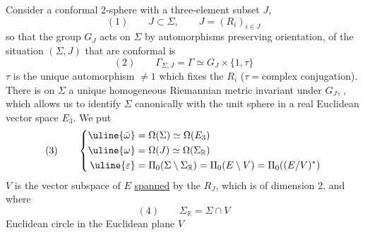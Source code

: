 Consider a conformal 2-sphere \inserted{$\Sigma$} with a three-element subset $J$,
\[
(1)\qquad J\subset\Sigma,\qquad J=(R_i)_{i\in J}
\]
so that the group $G_J$ acts on $\Sigma$ by automorphisms  preserving orientation,    of the situation $(\Sigma,J)$ that are conformal is
\[
(2)\qquad\Gamma_{\Sigma,J}=\Gamma\simeq G_J\times\{1,\tau\}
\]
$\tau$ is the unique  automorphism $\ne1$  which fixes the $R_i$  ($\tau={}$complex conjugation).
There is on $\Sigma$ a unique homogeneous Riemannian metric invariant under $G_J$,  , which allows us to identify $\Sigma$ canonically with the unit sphere in a real Euclidean vector space $E_3$. We put
\[
(3)\qquad\left\{\begin{aligned}
\uline{\bar\omega}&=\Omega(\Sigma)\simeq\Omega(E_3)\\
\uline{\omega}&=\Omega(J)\simeq\Omega(\Sigma_{\mathbb R})\\
\uline{\varepsilon}&=\Pi_0(\Sigma\setminus\Sigma_{\mathbb R})=\Pi_0(E\setminus V)=\Pi_0((E/V)^*)
\end{aligned}\right.
\]
$V$ is the vector subspace of $E$ \uline{spanned} by the $R_J$, which is of dimension 2, and where
\[
(4)\qquad\Sigma_{\mathbb R}=\Sigma\cap V
\]
Euclidean circle in the Euclidean plane $V$
